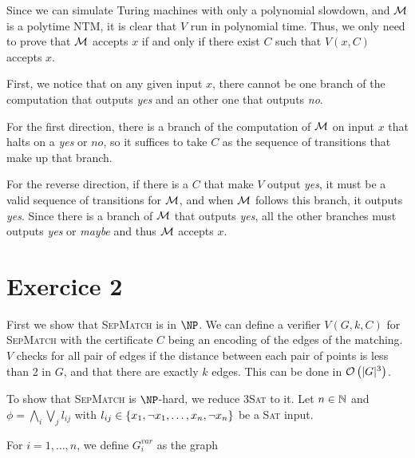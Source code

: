     Since we can simulate Turing machines with only a polynomial slowdown,
    and $\mathcal{M}$ is a polytime NTM, 
    it is clear that $V$ run in polynomial time.
    Thus, we only need to prove that $\mathcal{M}$ accepts $x$ if and only if there exist $C$
    such that $V(x, C)$ accepts $x$. 

    First, we notice that on any given input $x$, there cannot be one branch 
    of the computation that outputs \textit{yes} and an other one that outputs \textit{no}.
    
    For the first direction, there is a branch of the computation of 
    $\mathcal{M}$ on input $x$ that halts on a \textit{yes} or $\textit{no}$,
    so it suffices to take $C$ as the sequence of transitions
    that make up that branch.

    For the reverse direction, if there is a $C$ that make $V$ output \textit{yes},
    it must be a valid sequence of transitions for $\mathcal{M}$, 
    and when $\mathcal{M}$ follows this branch, it outputs \textit{yes}.
    Since there is a branch of $\mathcal{M}$ that outputs \textit{yes},
    all the other branches must outputs \textit{yes} or \textit{maybe}
    and thus $\mathcal{M}$ accepts $x$.


    \section*{Exercice 2}

    First we show that \textsc{SepMatch} is in $\NP$.
    We can define a verifier $V(G, k, C)$ 
    for \textsc{SepMatch} with the certificate $C$ being
    an encoding of the edges of the matching.
    $V$ checks for all pair of edges if the distance
    between each pair of points is less than 2 in $G$, 
    and that there are exactly $k$ edges. This can be done
    in $\mathcal{O}\left(|G|^3\right)$.

    To show that \textsc{SepMatch} is $\NP$-hard,
    we reduce \textsc{3Sat} to it.
    Let $n \in \mathbb N$ and $\phi = \bigwedge_{i} \bigvee_j l_{ij}$
    with $l_{ij} \in \left\{ x_1, \neg x_1, \dots, x_n, \neg x_n \right\}$
    be a \textsc{Sat} input.

    For $i = 1, \dots, n$, we define 
    $G^{var}_i$ as the graph
    \begin{center}
    \end{center}

